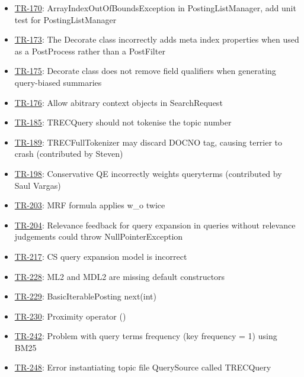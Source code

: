 \begin{itemize}
\tightlist
\item
  \href{http://terrier.org/issues/browse/TR-170}{TR-170}:
  ArrayIndexOutOfBoundsException in PostingListManager, add unit test
  for PostingListManager
\item
  \href{http://terrier.org/issues/browse/TR-173}{TR-173}: The Decorate
  class incorrectly adds meta index properties when used as a
  PostProcess rather than a PostFilter
\item
  \href{http://terrier.org/issues/browse/TR-175}{TR-175}: Decorate class
  does not remove field qualifiers when generating query-biased
  summaries
\item
  \href{http://terrier.org/issues/browse/TR-176}{TR-176}: Allow abitrary
  context objects in SearchRequest
\item
  \href{http://terrier.org/issues/browse/TR-185}{TR-185}: TRECQuery
  should not tokenise the topic number
\item
  \href{http://terrier.org/issues/browse/TR-189}{TR-189}:
  TRECFullTokenizer may discard DOCNO tag, causing terrier to crash
  (contributed by Steven)
\item
  \href{http://terrier.org/issues/browse/TR-198}{TR-198}: Conservative
  QE incorrectly weights queryterms (contributed by Saul Vargas)
\item
  \href{http://terrier.org/issues/browse/TR-203}{TR-203}: MRF formula
  applies w\_o twice
\item
  \href{http://terrier.org/issues/browse/TR-204}{TR-204}: Relevance
  feedback for query expansion in queries without relevance judgements
  could throw NullPointerException
\item
  \href{http://terrier.org/issues/browse/TR-217}{TR-217}: CS query
  expansion model is incorrect
\item
  \href{http://terrier.org/issues/browse/TR-228}{TR-228}: ML2 and MDL2
  are missing default constructors
\item
  \href{http://terrier.org/issues/browse/TR-229}{TR-229}:
  BasicIterablePosting next(int)
\item
  \href{http://terrier.org/issues/browse/TR-230}{TR-230}: Proximity
  operator ()
\item
  \href{http://terrier.org/issues/browse/TR-242}{TR-242}: Problem with
  query terms frequency (key frequency = 1) using BM25
\item
  \href{http://terrier.org/issues/browse/TR-248}{TR-248}: Error
  instantiating topic file QuerySource called TRECQuery

\end{itemize}

